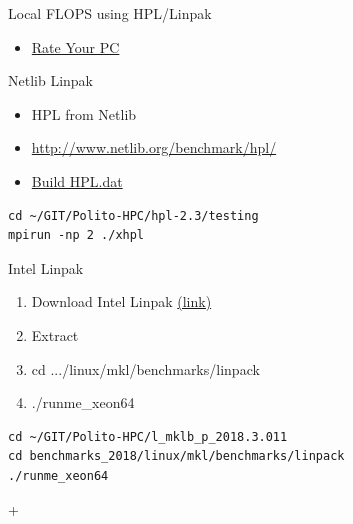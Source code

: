 \documentclass[ignorenonframetext,]{beamer}
\providecommand{\tightlist}{%
  \setlength{\itemsep}{0pt}\setlength{\parskip}{0pt}}
\begin{document}
\begin{frame}[fragile]{Local FLOPS using HPL/Linpak}

\begin{itemize}
\tightlist
\item
  \href{http://hpl-calculator.sourceforge.net/}{Rate Your PC}
\end{itemize}

\begin{block}{Netlib Linpak}

\begin{itemize}
\tightlist
\item
  HPL from Netlib
\item
  \url{http://www.netlib.org/benchmark/hpl/}
\item
  \href{https://www.advancedclustering.com/act_kb/tune-hpl-dat-file/}{Build
  HPL.dat}
\end{itemize}

\begin{verbatim}
cd ~/GIT/Polito-HPC/hpl-2.3/testing
mpirun -np 2 ./xhpl
\end{verbatim}

\end{block}

\begin{block}{Intel Linpak}


\begin{enumerate}
\tightlist
\item
  Download Intel Linpak
  \href{https://software.intel.com/en-us/articles/intel-mkl-benchmarks-suite}{(link)}
\item
  Extract
\item
  cd .../linux/mkl/benchmarks/linpack
\item
  ./runme\_xeon64
\end{enumerate}

\begin{verbatim}
cd ~/GIT/Polito-HPC/l_mklb_p_2018.3.011
cd benchmarks_2018/linux/mkl/benchmarks/linpack
./runme_xeon64
\end{verbatim}

+

\end{block}

\end{frame}
\end{document}
